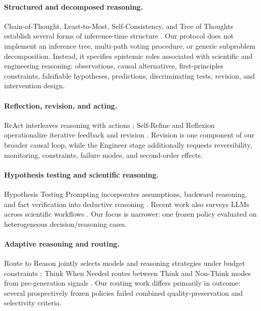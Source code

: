 \documentclass[11pt]{article}
\begin{document}
\paragraph{Structured and decomposed reasoning.}
Chain-of-Thought, Least-to-Most, Self-Consistency, and Tree of Thoughts establish several forms of inference-time structure \citep{wei2022chain,zhou2023least,wang2023selfconsistency,yao2023tree}. Our protocol does not implement an inference tree, multi-path voting procedure, or generic subproblem decomposition. Instead, it specifies epistemic roles associated with scientific and engineering reasoning: observations, causal alternatives, first-principles constraints, falsifiable hypotheses, predictions, discriminating tests, revision, and intervention design.

\paragraph{Reflection, revision, and acting.}
ReAct interleaves reasoning with actions \citep{yao2023react}; Self-Refine and Reflexion operationalize iterative feedback and revision \citep{madaan2023selfrefine,shinn2023reflexion}. Revision is one component of our broader causal loop, while the Engineer stage additionally requests reversibility, monitoring, constraints, failure modes, and second-order effects.

\paragraph{Hypothesis testing and scientific reasoning.}
Hypothesis Testing Prompting incorporates assumptions, backward reasoning, and fact verification into deductive reasoning \citep{li2024hypothesis}. Recent work also surveys LLMs across scientific workflows \citep{zhang2025scientific}. Our focus is narrower: one frozen policy evaluated on heterogeneous decision/reasoning cases.

\paragraph{Adaptive reasoning and routing.}
Route to Reason jointly selects models and reasoning strategies under budget constraints \citep{pan2025route}; Think When Needed routes between Think and Non-Think modes from pre-generation signals \citep{guo2026think}. Our routing work differs primarily in outcome: several prospectively frozen policies failed combined quality-preservation and selectivity criteria.
\end{document}
